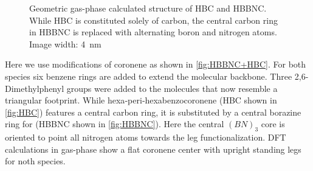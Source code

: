 \begin{figure}[h!]\centering
	 \quad
	\caption{Geometric gas-phase calculated structure of  HBC and  HBBNC. While HBC is constituted solely of carbon, the central carbon ring in HBBNC is replaced with alternating boron and nitrogen atoms. Image width: \SI{4}{\nano \meter}}
	\label{fig:HBBNC+HBC}
\end{figure}


Here we use modifications of coronene as shown in \autoref{fig:HBBNC+HBC}. For both species six benzene rings are added to extend the molecular backbone. Three 2,6-Dimethylphenyl groups were added to the molecules that now resemble a triangular footprint. While hexa‐peri‐hexabenzocoronene (HBC shown in \autoref{fig:HBC}) features a central carbon ring, it is substituted by a central borazine ring for (HBBNC shown in \autoref{fig:HBBNC}). Here the central $(BN)_3$ core is oriented to point all nitrogen atoms towards the leg functionalization. DFT calculations in gas-phase show a flat coronene center with upright standing legs for noth species.


